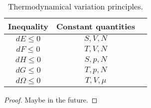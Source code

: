     \begin{table}[h!]
        \centering
        \begin{tabular}{c | c | c}
        Inequality & Constant quantities & \\
        \hline
        $d E \leq 0$ & $S, V, N$\\ 
        $d F \leq 0$ & $T, V, N$\\ 
        $d H \leq 0$ & $S, p, N$\\ 
        $d G \leq 0$ & $T, p, N$\\ 
        $d \Omega \leq 0$ & $T, V, \mu$\\ 
        \end{tabular}
    \caption{Thermodynamical variation principles.}
    \label{table:3}
    \end{table}

    \begin{proof}
        Maybe in the future.
    \end{proof}